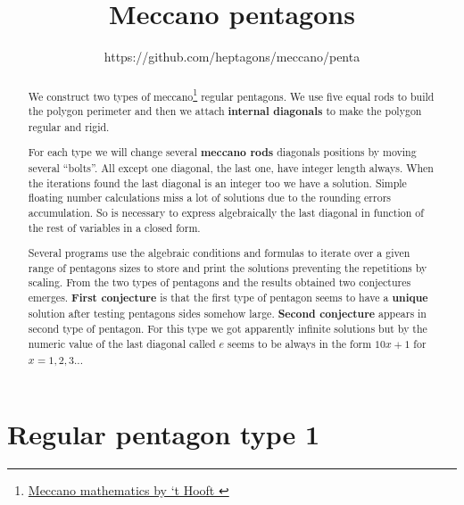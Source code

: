 \documentclass[11pt]{article}
\title{\textbf{Meccano pentagons}}
\author{https://github.com/heptagons/meccano/penta}
\date{}
\begin{document}
\maketitle
\begin{abstract}
We construct two types of meccano\footnote{
\href{https://webspace.science.uu.nl/~hooft101/lectures/meccano.pdf}{Meccano mathematics by `t Hooft }
}
regular pentagons.
We use five equal rods to build the polygon perimeter and then we attach \textbf{internal diagonals} to make the polygon regular and rigid.

For each type we will change several \textbf{meccano rods} diagonals positions by moving several ``bolts''.
All except one diagonal, the last one, have integer length always.
When the iterations found the last diagonal is an integer too we have a solution.
Simple floating number calculations miss a lot of solutions due to the rounding errors accumulation.
So is necessary to express algebraically the last diagonal in function of the rest of variables
in a closed form.

Several programs use the algebraic conditions and formulas to iterate over a given range of 
pentagons sizes to store and print the solutions preventing the repetitions by scaling.
\newline\newline
From the two types of pentagons and the results obtained two conjectures emerges.
\textbf{First conjecture} is
that the first type of pentagon seems to have a \textbf{unique} solution after testing
pentagons sides somehow large.
\newline\newline
\textbf{Second conjecture} appears in second type of pentagon. For this type we got apparently
infinite solutions but by the numeric value of the last diagonal called $e$ seems to be always in the form \textbf{$10x + 1$} for $x = 1,2,3..$.
\end{abstract}

\section{Regular pentagon type 1}
\end{document}
